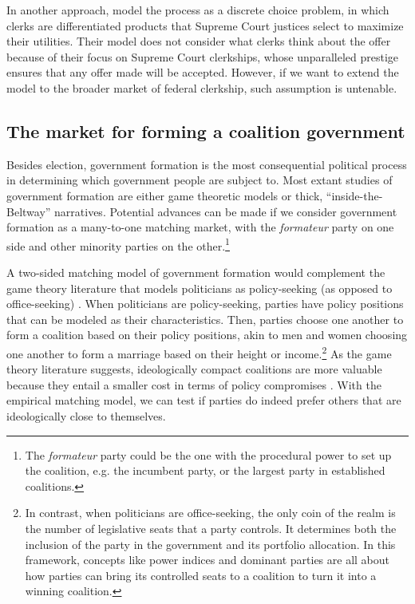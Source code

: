 In another approach, \citet{Rozema2016} model the process as a discrete choice
problem, in which clerks are differentiated products that Supreme Court justices
select to maximize their utilities. Their model does not consider what clerks
think about the offer because of their focus on Supreme Court clerkships, whose
unparalleled prestige ensures that any offer made will be accepted. However, if
we want to extend the model to the broader market of federal clerkship, such
assumption is untenable.

\subsection{The market for forming a coalition government}

Besides election, government formation is the most consequential political
process in determining which government people are subject to. Most extant
studies of government formation are either game theoretic models or thick,
``inside-the-Beltway'' narratives. Potential advances can be made if we consider
government formation as a many-to-one matching market, with the
\textit{formateur} party on one side and other minority parties on the
other.\footnote{The \textit{formateur} party could be the one with the
  procedural power to set up the coalition, e.g. the incumbent party, or the
  largest party in established coalitions.}

A two-sided matching model of government formation would complement the game
theory literature that models politicians as policy-seeking (as opposed to
office-seeking) \citep{Laver1998}. When politicians are policy-seeking, parties
have policy positions that can be modeled as their characteristics. Then,
parties choose one another to form a coalition based on their policy positions,
akin to men and women choosing one another to form a marriage based on their
height or income.\footnote{In contrast, when politicians are office-seeking, the
  only coin of the realm is the number of legislative seats that a party
  controls. It determines both the inclusion of the party in the government and
  its portfolio allocation. In this framework, concepts like power indices and
  dominant parties are all about how parties can bring its controlled seats to a
  coalition to turn it into a winning coalition.} As the game theory literature
suggests, ideologically compact coalitions are more valuable because they entail
a smaller cost in terms of policy compromises \citep{DeSwaan1973}. With the empirical
matching model, we can test if parties do indeed prefer others that are
ideologically close to themselves.

